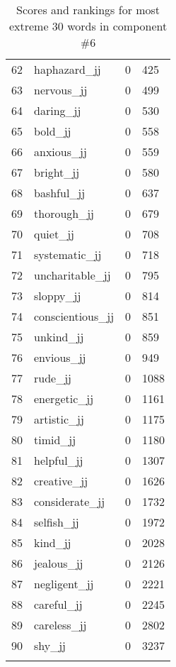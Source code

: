 \begin{longtable}[!htbp]{| rlr@{.}l |}
    62 & haphazard\_jj & 0 & 425 \\
    63 & nervous\_jj & 0 & 499 \\
    64 & daring\_jj & 0 & 530 \\
    65 & bold\_jj & 0 & 558 \\
    66 & anxious\_jj & 0 & 559 \\
    67 & bright\_jj & 0 & 580 \\
    68 & bashful\_jj & 0 & 637 \\
    69 & thorough\_jj & 0 & 679 \\
    70 & quiet\_jj & 0 & 708 \\
    71 & systematic\_jj & 0 & 718 \\
    72 & uncharitable\_jj & 0 & 795 \\
    73 & sloppy\_jj & 0 & 814 \\
    74 & conscientious\_jj & 0 & 851 \\
    75 & unkind\_jj & 0 & 859 \\
    76 & envious\_jj & 0 & 949 \\
    77 & rude\_jj & 0 & 1088 \\
    78 & energetic\_jj & 0 & 1161 \\
    79 & artistic\_jj & 0 & 1175 \\
    80 & timid\_jj & 0 & 1180 \\
    81 & helpful\_jj & 0 & 1307 \\
    82 & creative\_jj & 0 & 1626 \\
    83 & considerate\_jj & 0 & 1732 \\
    84 & selfish\_jj & 0 & 1972 \\
    85 & kind\_jj & 0 & 2028 \\
    86 & jealous\_jj & 0 & 2126 \\
    87 & negligent\_jj & 0 & 2221 \\
    88 & careful\_jj & 0 & 2245 \\
    89 & careless\_jj & 0 & 2802 \\
    90 & shy\_jj & 0 & 3237 \\
    \hline
    \caption{Scores and rankings for most extreme 30 words in component \#6} \\
\end{longtable}
